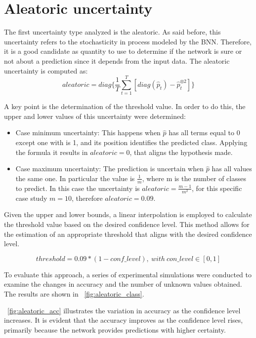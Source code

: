 \section{Aleatoric uncertainty}

The first uncertainty type analyzed is the aleatoric. As said before, this uncertainty refers to the stochasticity in process modeled by the BNN. Therefore, it is a good candidate as quantity to use to determine if the network is sure or not about a prediction since it depends from the input data. The aleatoric uncertainty is computed as:
\[
	aleatoric = diag\{\frac{1}{T} \sum_{t=1}^{T} [diag(\hat{p}_t) - \hat{p}_t^{\otimes 2}]\}
\]

A key point is the determination of the threshold value. In order to do this, the upper and lower values of this uncertainty  were determined:

\begin{itemize}
	\item Case minimum uncertainty: This happens when $\hat{p}$ has all terms equal to 0 except one with is 1, and its position identifies the predicted class. Applying the formula it results in $aleatoric = 0$, that aligns the hypothesis made. 
	\item Case maximum uncertainty: The prediction is uncertain when $\hat{p}$ has all values the same one. In particular the value is $\frac{1}{m}$, where m is the number of classes to predict. In this case the uncertainty is $aleatoric = \frac{m-1}{m^2}$, for this specific case study $m = 10$, therefore $aleatoric = 0.09$.
\end{itemize}

Given the upper and lower bounds, a linear interpolation is employed to calculate the threshold value based on the desired confidence level. This method allows for the estimation of an appropriate threshold that aligns with the desired confidence level. 

\[
	threshold = 0.09 * (1 - conf \_ level), \ with \ con \_ level \in [0,1]
\]


To evaluate this approach, a series of experimental simulations were conducted to examine the changes in accuracy and the number of unknown values obtained. The results are shown in \Fig~\ref{fig:aleatoric_class}.

\Fig~\ref{fig:aleatoric_acc} illustrates the variation in accuracy as the confidence level increases. It is evident that the accuracy improves as the confidence level rises, primarily because the network provides predictions with higher certainty.

